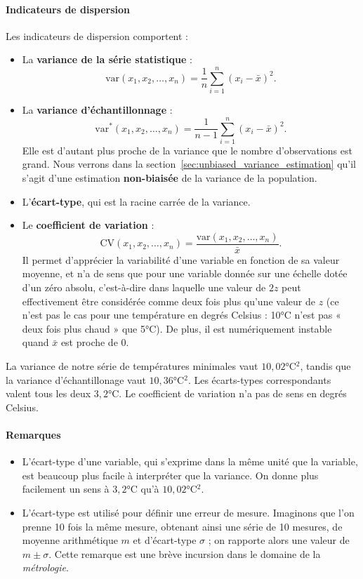 \paragraph{Indicateurs de dispersion} Les indicateurs de dispersion comportent : 
\begin{itemize}
	\item La \textbf{variance de la série statistique} :
	\[ \text{var}(x_1, x_2, \dots, x_n) = \frac1n \sum_{i=1}^n (x_i - \bar x)^2.\]
	\item La \textbf{variance d'échantillonnage} :
	\[ \text{var}^*(x_1, x_2, \dots, x_n) = \frac1{n-1} \sum_{i=1}^n (x_i - \bar
	x)^2.\]
	Elle est d'autant plus proche de la variance que le
	nombre d'observations est grand. Nous verrons dans la
	section~\ref{sec:unbiased_variance_estimation} qu'il s'agit d'une estimation
	\textbf{non-biaisée} de la variance de la population.
	\item L'\textbf{écart-type}, qui est la racine carrée de la variance.
	\item Le \textbf{coefficient de variation} :
	\[ \text{CV}(x_1, x_2, \dots, x_n) = \frac{\text{var}(x_1, x_2, \dots, x_n)}{\bar
		x}.\]
	Il permet d'apprécier la variabilité d'une variable
	en fonction de sa valeur moyenne, et n'a de sens que pour une variable donnée
	sur une échelle dotée d'un zéro absolu, c'est-à-dire dans laquelle une valeur
	de $2z$ peut effectivement être considérée comme deux fois plus qu'une valeur
	de $z$ (ce n'est pas le cas pour une température en degrés Celsius :
	10\si{\celsius} n'est pas « deux fois plus chaud » que 5\si{\celsius}). De
	plus, il est numériquement instable quand $\bar x$ est proche de 0.
\end{itemize}

\begin{exemple}
	La variance de notre série de températures minimales vaut $10,02 \si{\celsius^2}$,
	tandis que la variance d'échantillonage vaut $10,36 \si{\celsius^2}$. Les
	écarts-types correspondants valent tous les deux $3,2 \si{\celsius}$.  Le
	coefficient de variation n'a pas de sens en degrés Celsius.
\end{exemple}
\paragraph{Remarques}
\begin{itemize}
	\item L'écart-type d'une variable, qui s'exprime dans la même unité que la
	variable, est beaucoup plus facile à interpréter que la variance. On donne
	plus facilement un sens à $3,2 \si{\celsius}$ qu'à $10,02 \si{\celsius^2}$.
	\item L'écart-type est utilisé pour définir une erreur de mesure. Imaginons que
	l'on prenne 10 fois la même mesure, obtenant ainsi une série de 10
	mesures, de moyenne arithmétique $m$ et d'écart-type $\sigma$ ; on rapporte
	alors une valeur de $m \pm \sigma$. Cette remarque est une brève incursion
	dans le domaine de la \textit{métrologie}.
\end{itemize}

